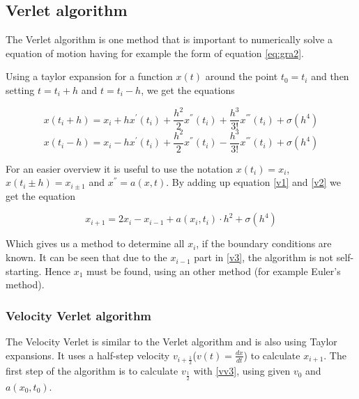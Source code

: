 \documentclass[10pt,a4paper]{article}
\begin{document}

\subsection{Verlet algorithm}

The Verlet algorithm is one method that is important to numerically solve a equation of motion having for example the form of equation \eqref{eq:gra2}. 

Using a taylor expansion for a function $x(t)$ around the point $t_0 = t_i$ and then setting $t = t_i + h$ and $t = t_i - h$, we get the equations

\begin{equation}
\label{v1}
x(t_i + h) = x_i + h  x^{'}(t_i) + \frac{h^2}{2}  x^{''}(t_i) + \frac{h^3}{3!}  x^{'''}(t_i) + \sigma (h^4)
\end{equation}
\begin{equation}
\label{v2}
x(t_i - h) = x_i - h  x^{'}(t_i) + \frac{h^2}{2}  x^{''}(t_i) - \frac{h^3}{3!}  x^{'''}(t_i) + \sigma (h^4)
\end{equation}

For an easier overview it is useful to use the notation $x(t_i) = x_i$, $x(t_i \pm h) = x_{i \pm 1}$ and $x^{''} = a(x, t)$. By adding up equation \eqref{v1} and \eqref{v2} we get the equation

\begin{equation}
\label{v3}
	x_{i+1} = 2 x_i - x_{i-1} + a(x_i, t_i) \cdot h^2 + \sigma(h^4)
\end{equation}

Which gives us a method to determine all $x_i$, if the boundary conditions are known. It can be seen that due to the $x_{i-1}$ part in \eqref{v3}, the algorithm is not self-starting. Hence $x_1$ must be found, using an other method (for example Euler's method).

\subsubsection{Velocity Verlet algorithm}

The Velocity Verlet is similar to the Verlet algorithm and is also using Taylor expansions. It uses a half-step velocity $v_{i+\frac{1}{2}}$($v(t) = \frac{dx}{dt}$) to calculate $x_{i+1}$. The first step of the algorithm is to calculate $v_{\frac{1}{2}}$ with \eqref{vv3}, using given $v_0$ and $a(x_0, t_0)$.
\end{document}
